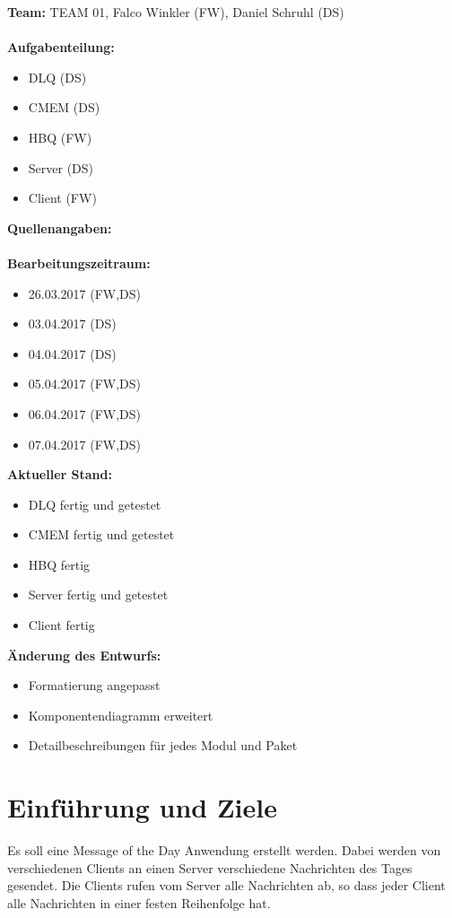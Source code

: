 \documentclass{article}
\begin{document}
\textbf{Team:} TEAM 01, Falco Winkler (FW), Daniel Schruhl (DS)\\
\\
\textbf{Aufgabenteilung:}
\begin{itemize}
    \item DLQ (DS)
    \item CMEM (DS)
	\item HBQ (FW)
	\item Server (DS)
	\item Client (FW)
\end{itemize}

\textbf{Quellenangaben:}\\
\\
\textbf{Bearbeitungszeitraum:}
\begin{itemize}
	\item 26.03.2017 (FW,DS)
	\item 03.04.2017 (DS)
	\item 04.04.2017 (DS)
	\item 05.04.2017 (FW,DS)
	\item 06.04.2017 (FW,DS)
	\item 07.04.2017 (FW,DS)
\end{itemize}

\textbf{Aktueller Stand:}
\begin{itemize}
	\item DLQ fertig und getestet
	\item CMEM fertig und getestet
	\item HBQ fertig
	\item Server fertig und getestet
	\item Client fertig
\end{itemize}

\textbf{Änderung des Entwurfs:}
\begin{itemize}
    \item Formatierung angepasst
	\item Komponentendiagramm erweitert
	\item Detailbeschreibungen für jedes Modul und Paket
\end{itemize}

\newpage

\section{Einführung und Ziele}
Es soll eine Message of the Day Anwendung erstellt werden. Dabei werden von verschiedenen Clients an einen Server verschiedene Nachrichten des Tages gesendet. Die Clients rufen vom Server alle Nachrichten ab, so dass jeder Client alle Nachrichten in einer festen Reihenfolge hat.
\end{document}
